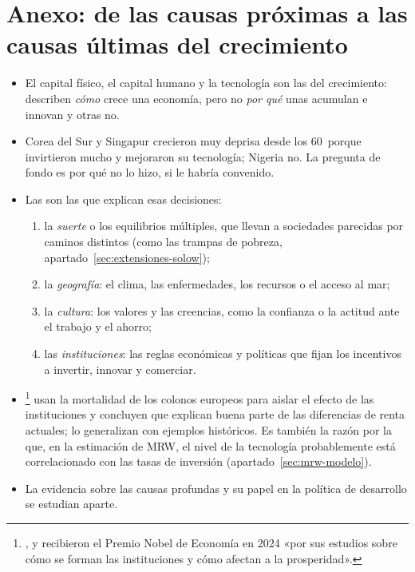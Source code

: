 \documentclass[11pt]{article}
\begin{document}
\section{Anexo: de las causas próximas\cortetitulo{} a las causas últimas del crecimiento}\label{anexo:causas}

\begin{itemize}
\item El capital físico, el capital humano y la tecnología son las  del crecimiento: describen \emph{cómo} crece una economía, pero no \emph{por qué} unas acumulan e innovan y otras no.
\item Corea del Sur y Singapur crecieron muy deprisa desde los 60~porque invirtieron mucho y mejoraron su tecnología; Nigeria no. La pregunta de fondo es por qué no lo hizo, si le habría convenido.
\item Las  son las que explican esas decisiones\nocite{Acemoglu2009}:
  \begin{enumerate}
  \item la \emph{suerte} o los equilibrios múltiples, que llevan a sociedades parecidas por caminos distintos (como las trampas de pobreza, apartado~\ref{sec:extensiones-solow});
  \item la \emph{geografía}: el clima, las enfermedades, los recursos o el acceso al mar;
  \item la \emph{cultura}: los valores y las creencias, como la confianza o la actitud ante el trabajo y el ahorro;
  \item las \emph{instituciones}: las reglas económicas y políticas que fijan los incentivos a invertir, innovar y comerciar.
  \end{enumerate}
\item \textcite{AcemogluJohnsonRobinson2001Colonial}\footnote{,  y  recibieron el Premio Nobel de Economía en 2024 «por sus estudios sobre cómo se forman las instituciones y cómo afectan a la prosperidad»\nocite{NobelPrize2024}.} usan la mortalidad de los colonos europeos para aislar el efecto de las instituciones y concluyen que explican buena parte de las diferencias de renta actuales; \textcite{AcemogluRobinson2012} lo generalizan con ejemplos históricos. Es también la razón por la que, en la estimación de MRW, el nivel de la tecnología probablemente está correlacionado con las tasas de inversión (apartado~\ref{sec:mrw-modelo}).
\item La evidencia sobre las causas profundas  y su papel en la política de desarrollo  se estudian aparte.
\end{itemize}
\end{document}
